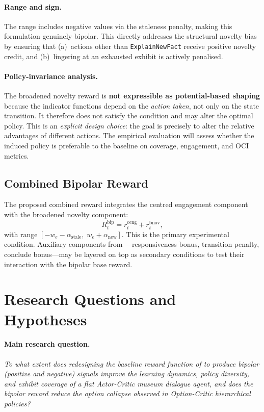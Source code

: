 \documentclass[12pt,a4paper]{article}
\newcommand{\rceng}{r^{\mathrm{ceng}}_t}
\newcommand{\rbnov}{r^{\mathrm{bnov}}_t}
\newcommand{\Rbip}{R^{\mathrm{bip}}_t}
\begin{document}
\paragraph{Range and sign.} The range includes negative values via the staleness penalty, making this formulation genuinely bipolar. This directly addresses the structural novelty bias by ensuring that (a)~actions other than \texttt{ExplainNewFact} receive positive novelty credit, and (b)~lingering at an exhausted exhibit is actively penalised.

\paragraph{Policy-invariance analysis.}
The broadened novelty reward is \textbf{not expressible as potential-based shaping} because the indicator functions depend on the \emph{action taken}, not only on the state transition. It therefore does not satisfy the \citet{ng1999} condition and may alter the optimal policy. This is an \emph{explicit design choice}: the goal is precisely to alter the relative advantages of different actions. The empirical evaluation will assess whether the induced policy is preferable to the baseline on coverage, engagement, and OCI metrics.

\subsection{Combined Bipolar Reward}

The proposed combined reward integrates the centred engagement component with the broadened novelty component:
\begin{equation}
\label{eq:combined}
\Rbip = \rceng + \rbnov,
\end{equation}
with range $[-w_e - \alpha_{\mathrm{stale}},\; w_e + \alpha_{\mathrm{new}}]$. This is the primary experimental condition. Auxiliary components from \citet{bourdon2025}---responsiveness bonus, transition penalty, conclude bonus---may be layered on top as secondary conditions to test their interaction with the bipolar base reward.

\section{Research Questions and Hypotheses}
\label{sec:rqs}

\paragraph{Main research question.}
\textit{To what extent does redesigning the baseline reward function of \citet{bourdon2025} to produce bipolar (positive and negative) signals improve the learning dynamics, policy diversity, and exhibit coverage of a flat Actor-Critic museum dialogue agent, and does the bipolar reward reduce the option collapse observed in Option-Critic hierarchical policies?}
\end{document}
